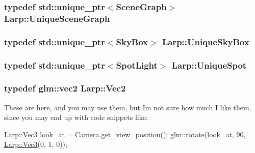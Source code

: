 \subsubsection[{\texorpdfstring{Unique\+Scene\+Graph}{UniqueSceneGraph}}]{\setlength{\rightskip}{0pt plus 5cm}typedef std\+::unique\+\_\+ptr$<${\bf Scene\+Graph}$>$ {\bf Larp\+::\+Unique\+Scene\+Graph}}\hypertarget{namespaceLarp_a81a0d129ec1fc8f1f9fa231fbba6b19b}{}\label{namespaceLarp_a81a0d129ec1fc8f1f9fa231fbba6b19b}
\subsubsection[{\texorpdfstring{Unique\+Sky\+Box}{UniqueSkyBox}}]{\setlength{\rightskip}{0pt plus 5cm}typedef std\+::unique\+\_\+ptr$<${\bf Sky\+Box}$>$ {\bf Larp\+::\+Unique\+Sky\+Box}}\hypertarget{namespaceLarp_a9acaa85c01aee19dafa995b4eba59bd0}{}\label{namespaceLarp_a9acaa85c01aee19dafa995b4eba59bd0}
\subsubsection[{\texorpdfstring{Unique\+Spot}{UniqueSpot}}]{\setlength{\rightskip}{0pt plus 5cm}typedef std\+::unique\+\_\+ptr$<${\bf Spot\+Light}$>$ {\bf Larp\+::\+Unique\+Spot}}\hypertarget{namespaceLarp_a288b58c470c3ed41d3b23e764ba5b6eb}{}\label{namespaceLarp_a288b58c470c3ed41d3b23e764ba5b6eb}
\subsubsection[{\texorpdfstring{Vec2}{Vec2}}]{\setlength{\rightskip}{0pt plus 5cm}typedef glm\+::vec2 {\bf Larp\+::\+Vec2}}\hypertarget{namespaceLarp_ad25d627b744435e2a62f84fce6db89a6}{}\label{namespaceLarp_ad25d627b744435e2a62f84fce6db89a6}
These are here, and you may use them, but I\textquotesingle{}m not sure how much I like them, since you may end up with code snippets like\+:


\begin{DoxyCode}
\hyperlink{namespaceLarp_a477b379311661e072acd751be3d473aa}{Larp::Vec3} look\_at = \hyperlink{classCamera}{Camera}.get\_view\_position();
glm::rotate(look\_at, 90, \hyperlink{namespaceLarp_a477b379311661e072acd751be3d473aa}{Larp::Vec3}(0, 1, 0));
\end{DoxyCode}


